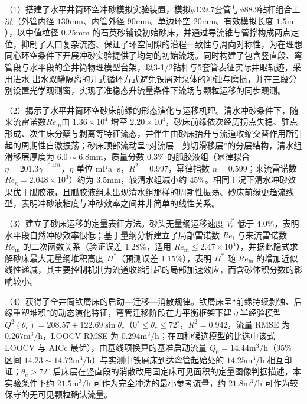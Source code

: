 （1）搭建了水平井筒环空冲砂模拟实验装置，模拟$\phi 139.7$套管与$\phi 88.9$钻杆组合工况（外管内径 $130\mathrm{mm}$、内管外径 $90\mathrm{mm}$、单边环空 $20\mathrm{mm}$、有效模拟长度 $1.5\mathrm{m}$），以中值粒径 $0.25\mathrm{mm}$ 的石英砂铺设初始砂床，并通过导流锥与管撑构成两点定位，抑制了入口复杂流态、保证了环空间隙的沿程一致性与周向对称性，为在理想同心环空条件下开展冲砂实验提供了均匀的初始流场。同时构建了包含竖直段、弯管段与水平段的全井筒物理模型台架，以3-1/2\inch 钻杆与5\inch 套管表征实际井眼轨迹，采用进水-出水双罐隔离的开式循环方式避免铁屑对泵体的冲蚀与磨损，并在三段分别设置光学观测窗，实现了准稳态升流量条件下流场与颗粒运移的同步观测。

（2）揭示了水平井筒环空砂床前缘的形态演化与运移机理。清水冲砂条件下，随来流雷诺数$Re_{\mathrm{in}}$由 $1.36\times10^4$ 增至 $2.20\times10^4$，砂床前缘依次经历拐点失稳、驻点形成、次生床分蘖与剥离等特征流态，并伴生由砂床抬升与流道收缩交替作用所引起的周期性自激振荡；砂床顶部流动呈“对流层＋剪切滑移层”的分层结构，清水组滑移层厚度为 $6.0\sim6.8\mathrm{mm}$，质量分数 0.3\% 的胍胶液组（幂律拟合 $\eta=201.3\dot\gamma^{-0.401}$，$\eta$ 单位 $\mathrm{mPa\cdot s}$，$R^2=0.997$，幂律指数 $n=0.599$；来流雷诺数 $Re_\mathrm{g}=2.048\times10^{3}$）约为 $3.5\mathrm{mm}$，较清水组减小约 45\%。相同工况下清水冲砂效果优于胍胶液，且胍胶液组未出现清水组那样的周期性振荡、砂床前缘更趋流线型，表明冲砂液粘度与冲砂效率之间并非简单的线性关系。

（3）建立了砂床运移的定量表征方法。砂头无量纲运移速度 $V_\mathrm{s}^*$ 低于 4.0\%，表明水平段自然冲砂效率很低；基于量纲分析建立了局部雷诺数 $Re_\mathrm{l}$ 与来流雷诺数 $Re_{\mathrm{in}}$ 的二次函数关系（验证误差 1.28\%，适用 $Re_{\mathrm{in}}\le2.47\times10^{4}$），并据此隐式求解砂床最大无量纲堆积高度 $H^*$（预测误差 1.15\%），表明 $H^*$ 随 $Re_{\mathrm{in}}$ 的增加近似线性递减，其主要控制机制为流道收缩引起的局部加速效应，而含砂体积分数的影响较小。

（4）获得了全井筒铁屑床的启动—迁移—消散规律。铁屑床呈“前缘持续剥蚀、后缘重塑堆积”的动态演化特征，弯管迁移阶段在力平衡框架下建立半经验模型 $Q^2(\theta_c)=208.57+122.69\sin\theta_c$（$0^\circ\le\theta_c\le72^\circ$，$R^2=0.942$，流量 RMSE 为 $0.267\mathrm{m^3/h}$，LOOCV RMSE 为 $0.294\mathrm{m^3/h}$；在四种候选模型的比选中该式 LOOCV 与 AICc 最优），由基线项换算的基准启动流量 $Q_0=14.44\mathrm{m^3/h}$（95\% 区间 $14.23\sim14.72\mathrm{m^3/h}$）与实测中铁屑床到达弯管起始处的 $14.25\mathrm{m^3/h}$ 相互印证；$\theta_c>72^\circ$ 后床层在竖直段的消散改用固定床可见面积的定量图像判据描述，本实验条件下约 $21.5\mathrm{m^3/h}$ 可作为完全冲洗的最小参考流量，约 $21.8\mathrm{m^3/h}$ 可作为较保守的无可见颗粒确认流量。

